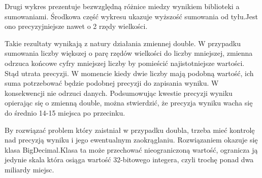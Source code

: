 \documentclass[12pt]{article}
\begin{document}
Drugi wykres prezentuje bezwzględną różnice miedzy wynikiem biblioteki a sumowaniami. 
Środkowa część wykresu ukazuje wyższość sumowania od tyłu.Jest ono precyzyjniejsze nawet o 2 rzędy wielkości.


\begin{center}
\end{center}

Takie rezultaty wynikają z natury działania zmiennej double. W przypadku sumowania liczby większej
o parę rzędów wielkości do liczby mniejszej, zmienna odrzuca końcowe cyfry mniejszej liczby by pomieścić 
najistotniejsze wartości. Stąd utrata precyzji. W momencie kiedy dwie liczby mają podobną wartość, ich suma potrzebować będzie podobnej precyzji do zapisania wyniku. W konsekwencji nie odrzuci danych.
Podsumowując kwestie precyzji wyniku opierając się o zmienną double, można stwierdzić, że precyzja wyniku wacha się do średnio 14-15 miejsca po przecinku.

By rozwiązać problem który zaistniał w przypadku doubla, trzeba mieć kontrolę nad precyzją wyniku i jego 
ewentualnym zaokrąglaniu. Rozwiązaniem okazuje się klasa BigDecimal.Klasa ta może przechować nieograniczoną 
wartość, ogranicza ją jedynie skala która osiąga wartość 32-bitowego integera, czyli trochę 
ponad dwa miliardy miejsc.
\end{document}
